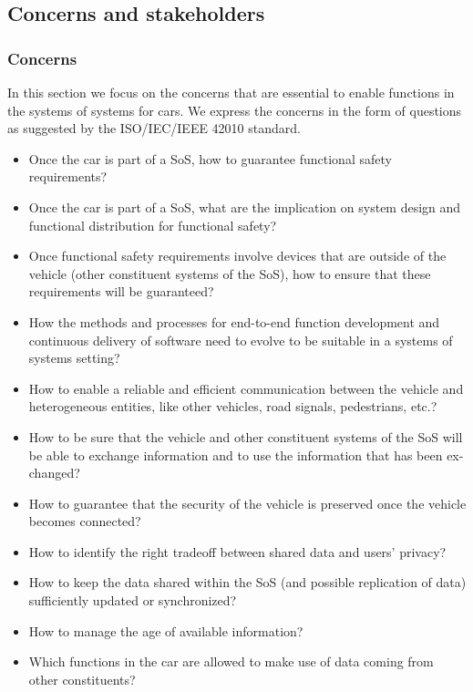 \subsection{Concerns and stakeholders} 





\subsubsection{Concerns}\label{vp:concerns}

In this section we focus on the concerns that are essential to enable functions in the systems of systems for cars. We express the concerns in the form of questions as suggested by the ISO/IEC/IEEE 42010 standard.

\begin{itemize}
\item Once the car is part of a SoS, how to guarantee functional safety requirements?
\item Once the car is part of a SoS, what are the implication on system design and functional distribution for functional safety?
\item Once functional safety requirements involve devices that are outside of the vehicle (other constituent systems of the SoS), how to ensure that these requirements will be guaranteed?
\item How the methods and processes for end-to-end function development and continuous delivery of software need to evolve to be suitable in a systems of systems setting?
\item How to enable a reliable and efficient communication between the vehicle and heterogeneous entities, like other vehicles, road signals, pedestrians, etc.?
\item How to be sure that the vehicle and other constituent systems of the SoS will be able to exchange information and to use the information that has been ex-changed?
\item How to guarantee that the security of the vehicle is preserved once the vehicle becomes connected?
\item How to identify the right tradeoff between shared data and users' privacy?
\item How to keep the data shared within the SoS (and possible replication of data) sufficiently updated or synchronized?
\item How to manage the age of available information?
\item Which functions in the car are allowed to make use of data coming from other constituents?
\end{itemize}




